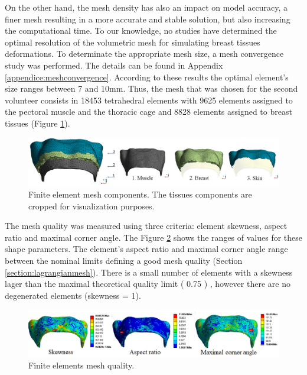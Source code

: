  On the other hand, the mesh density has also an impact on model accuracy, a finer mesh resulting in a more accurate and stable solution, but also increasing the computational time. To our knowledge, no studies have determined the optimal resolution of the volumetric mesh for simulating breast tissues deformations. To determinate the appropriate mesh size, a mesh convergence study was performed. The details can be found in Appendix \ref{appendice:meshconvergence}.  According to these results the optimal element’s size ranges between 7 and 10mm. Thus, the mesh that was chosen for the second volunteer consists in 18453 tetrahedral elements with 9625 elements assigned to the pectoral muscle and the thoracic cage and 8828 elements assigned to breast tissues (Figure \ref{fig:meshcomponents}).
 
 \begin{figure}[!h]
\centering
\includegraphics[width=1\textwidth,keepaspectratio]{figures/mesh3components.png} 
\caption{ Finite element mesh components. The tissues components are cropped for visualization purposes. }\label{fig:meshcomponents}
\end{figure}
 
 The mesh quality was measured using three criteria: element skewness, aspect ratio and maximal corner angle. The Figure \ref{fig:meshquality} shows the ranges of values for these shape parameters. The element's aspect ratio and maximal corner angle range between the nominal limits defining a good mesh quality (Section \ref{section:lagrangianmesh}). There is a small number of elements with a skewness lager than the maximal theoretical quality limit ( 0.75 ) , however there are no degenerated elements (skewness = 1).  

\begin{figure}[!h]
\centering
\includegraphics[width=1\textwidth,keepaspectratio]{figures/meshquality.jpg} 
\caption{ Finite elements mesh quality.}\label{fig:meshquality}
\end{figure}




